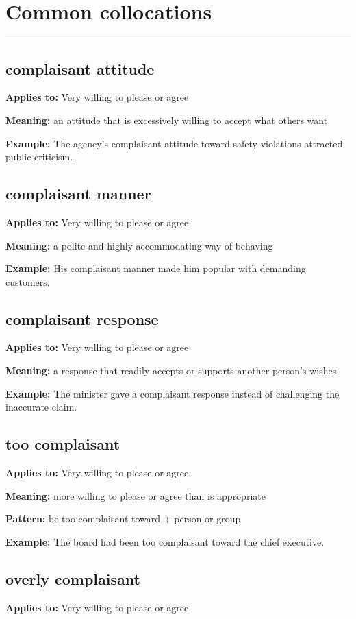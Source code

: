 \documentclass[11pt]{article}
\newcommand{\sectionrule}{\par\vspace{-0.5em}\noindent\textcolor{Accent}{\rule{\linewidth}{0.6pt}}\par}
\begin{document}
\section{Common collocations}
\sectionrule
\subsection{complaisant attitude}
\textbf{Applies to:} Very willing to please or agree

\textbf{Meaning:} an attitude that is excessively willing to accept what others want

\textbf{Example:} The agency's complaisant attitude toward safety violations attracted public criticism.

\subsection{complaisant manner}
\textbf{Applies to:} Very willing to please or agree

\textbf{Meaning:} a polite and highly accommodating way of behaving

\textbf{Example:} His complaisant manner made him popular with demanding customers.

\subsection{complaisant response}
\textbf{Applies to:} Very willing to please or agree

\textbf{Meaning:} a response that readily accepts or supports another person's wishes

\textbf{Example:} The minister gave a complaisant response instead of challenging the inaccurate claim.

\subsection{too complaisant}
\textbf{Applies to:} Very willing to please or agree

\textbf{Meaning:} more willing to please or agree than is appropriate

\textbf{Pattern:} be too complaisant toward + person or group

\textbf{Example:} The board had been too complaisant toward the chief executive.

\subsection{overly complaisant}
\textbf{Applies to:} Very willing to please or agree
\end{document}
